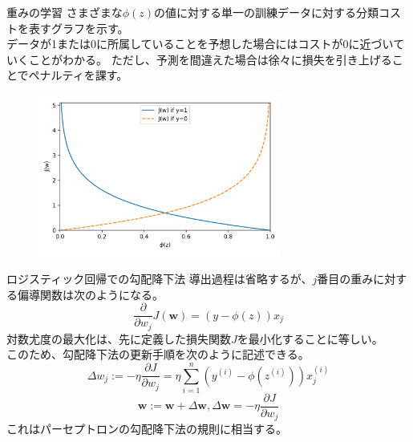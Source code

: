 \documentclass[aspectratio=169, dvipdfmx, 11pt]{beamer} %
\begin{document}
\begin{frame}{重みの学習}
    さまざまな\(\phi(z)\)の値に対する単一の訓練データに対する分類コストを表すグラフを示す。\\
    データが1または0に所属していることを予想した場合にはコストが0に近づいていくことがわかる。
    ただし、予測を間違えた場合は徐々に損失を引き上げることでペナルティを課す。
    \begin{figure}[b]
        \begin{center}
        \includegraphics[width=80mm]{img/day02/fig04.png}
        \end{center}
    \end{figure}
\end{frame}

\begin{frame}{ロジスティック回帰での勾配降下法}
    導出過程は省略するが、\(j\)番目の重みに対する偏導関数は次のようになる。
    \begin{equation*}
        \frac{\partial}{\partial w_j}J(\textbf{w}) = (y - \phi(z))x_j
    \end{equation*}
    対数尤度の最大化は、先に定義した損失関数\(J\)を最小化することに等しい。\\
    このため、勾配降下法の更新手順を次のように記述できる。
    \begin{equation*}
        \Delta w_j := - \eta \frac{\partial J}{\partial w_j} 
        = \eta \sum_{i=1}^{n} (y^{(i)} - \phi(z^{(i)}))x_{j}^{(i)}
    \end{equation*}
    \begin{equation*}
        \textbf{w} := \textbf{w} + \Delta \textbf{w}, \Delta \textbf{w} = - \eta \frac{\partial J}{\partial w_j} 
    \end{equation*}
    これはパーセプトロンの勾配降下法の規則に相当する。
\end{frame}
\end{document}
